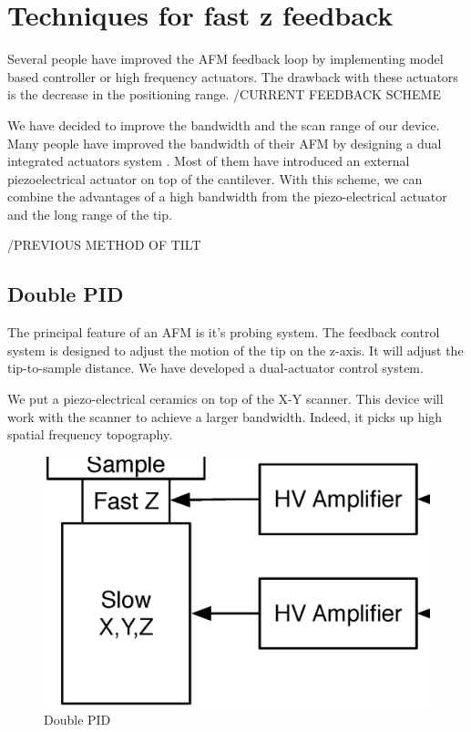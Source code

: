 \chapter{Techniques for fast z feedback}

Several people have improved the AFM feedback loop by implementing model based controller or high frequency actuators. The drawback with these actuators is the decrease in the positioning range.
/CURRENT FEEDBACK SCHEME

We have decided to improve the bandwidth and the scan range of our device. 
Many people have improved the bandwidth of their AFM by designing a dual integrated actuators system \cite{sulchek1999dual}. Most of them have introduced an external piezoelectrical actuator on top of the cantilever. With this scheme, we can combine the advantages of a high bandwidth from the piezo-electrical actuator and the long range of the tip.

/PREVIOUS METHOD OF TILT

\section{Double PID}

The principal feature of an AFM is it's probing system. \cite{jeong:093706} The feedback control system is designed to adjust the motion of the tip on the z-axis. It will adjust the tip-to-sample distance. We have developed a dual-actuator control system. 

We put a piezo-electrical ceramics on top of the X-Y scanner. This device will work with the scanner to achieve a larger bandwidth. Indeed, it picks up high spatial frequency topography. 

\begin{figure}[H]
  \centering
  \includegraphics[scale=0.3]{images/doublePID.eps}
    \caption{Double PID}
  \label{DoublePid}
\end{figure}

